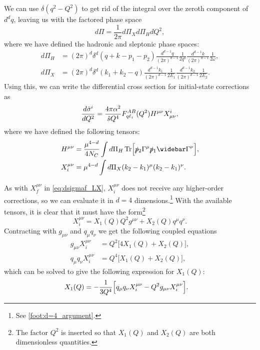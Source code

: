 We can use $\delta(q^2-Q^2)$ to get rid of the integral over the zeroth component of $d^dq$, leaving us with the factored phase space
\begin{equation}
    d\Pi = \frac{1}{2\pi} d\Pi_X d\Pi_H dQ^2,
    \label{eq:phase_space_factored}
\end{equation}
where we have defined the hadronic and sleptonic phase spaces:
\begin{subequations}
\begin{align}
    d\Pi_H &= (2\pi)^d \delta^d(q+k-p_1-p_2) \frac{d^{d-1}q}{(2\pi)^{d-1}}\frac{1}{2q^0}\frac{d^{d-1}k}{(2\pi)^{d-1}}\frac{1}{2\omega},
    \label{eq:phase_space_H}
    \\
    d\Pi_X &= (2\pi)^d \delta^d(k_1+k_2-q) \frac{d^{d-1}k_1}{(2\pi)^{d-1}}\frac{1}{2E_1}\frac{d^{d-1}k_2}{(2\pi)^{d-1}}\frac{1}{2E_2}.
    \label{eq:phase_space_L}
\end{align}
\end{subequations}
Using this, we can write the differential cross section for initial-state corrections as
\begin{equation}
    \frac{d\hat{\sigma}^i}{dQ^2} = \frac{4\pi\alpha^2}{\hat{s} Q^4}F_{q\ell_i}^{AB}(Q^2)
    H^{\mu\nu} X^i_{\mu\nu},
    \label{eq:dsigmai_HX}
\end{equation}
where we have defined the following tensors:
\begin{subequations}
\begin{align}
    H^{\mu\nu} &= \frac{\mu^{4-d}}{4\NC}\int d\Pi_H \Tr\Bigl[ \ptwoslash\Gamma^\mu\poneslash\widebar\Gamma^\nu \Bigr],
    \\
    X_i^{\mu\nu} &= \mu^{4-d} \int d\Pi_X (k_2-k_1)^\mu(k_2-k_1)^\nu.
    \label{eq:Ximunu}
\end{align}
\end{subequations}

As with $X_f^{\mu\nu}$ in \cref{eq:dsigmaf_LX}, $X_i^{\mu\nu}$ does not receive any higher-order corrections, so we can evaluate it in $d=4$ dimensions.\footnote{See \cref{foot:d=4_argument}.}
With the available tensors, it is clear that it must have the form\footnote{The factor $Q^2$ is inserted so that $X_1(Q)$ and $X_2(Q)$ are both dimensionless quantities.}
\begin{equation}
    X_i^{\mu\nu} = X_1(Q) Q^2 g^{\mu\nu} + X_2(Q) q^\mu q^\nu.
    \label{eq:X_decomp}
\end{equation}
Contracting with $g_{\mu\nu}$ and $q_\mu q_\nu$ we get the following coupled equations
\begin{subequations}
\begin{align}
    g_{\mu\nu}X_i^{\mu\nu} &= Q^2 \bigl[ 4 X_1(Q) + X_2(Q) \bigr],
    \\
    q_\mu q_\nu X_i^{\mu\nu} &= Q^4 \bigl[ X_1(Q) + X_2(Q) \bigr],
\end{align}
\end{subequations}
which can be solved to give the following expression for $X_1(Q)$:
\begin{align}
    X_1(Q) &= -\frac{1}{3Q^4} \Bigl[ q_\mu q_\nu X_i^{\mu\nu} - Q^2 g_{\mu\nu} X_i^{\mu\nu} \Bigr].
    \label{eq:X1_decomp}
\end{align}

